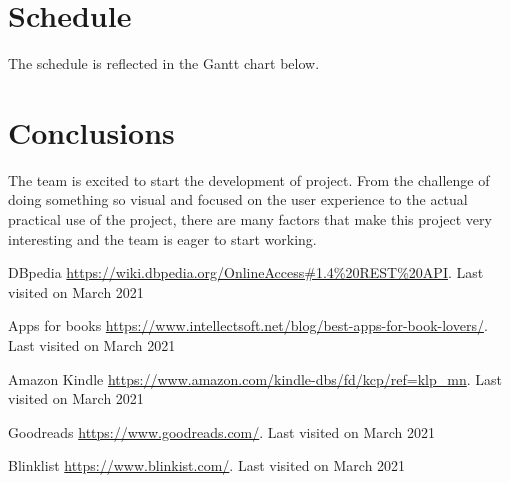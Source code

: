 \documentclass[twocolumn,twoside,11pt,a4paper]{article}
\begin{document}
\section{Schedule}\label{sec:conclusions}

The schedule is reflected in the Gantt chart below.





\section{Conclusions}\label{sec:conclusions}

The team is excited to start the development of project. From the challenge of doing something so visual and focused on the user experience to the actual practical use of the project, there are many factors that make this project very interesting and the team is eager to start working.


\begin{thebibliography}{9}
DBpedia 
\url{https://wiki.dbpedia.org/OnlineAccess#1.4\%20REST\%20API}. 
Last visited on March 2021


Apps for books
\url{https://www.intellectsoft.net/blog/best-apps-for-book-lovers/}. 
Last visited on March 2021


Amazon Kindle
\url{https://www.amazon.com/kindle-dbs/fd/kcp/ref=klp_mn}. 
Last visited on March 2021


Goodreads 
\url{https://www.goodreads.com/}. 
Last visited on March 2021


Blinklist
\url{https://www.blinkist.com/}. 
Last visited on March 2021

\end{thebibliography}

\renewcommand{\bibname}{Referências}
%
%

%


\end{document}
